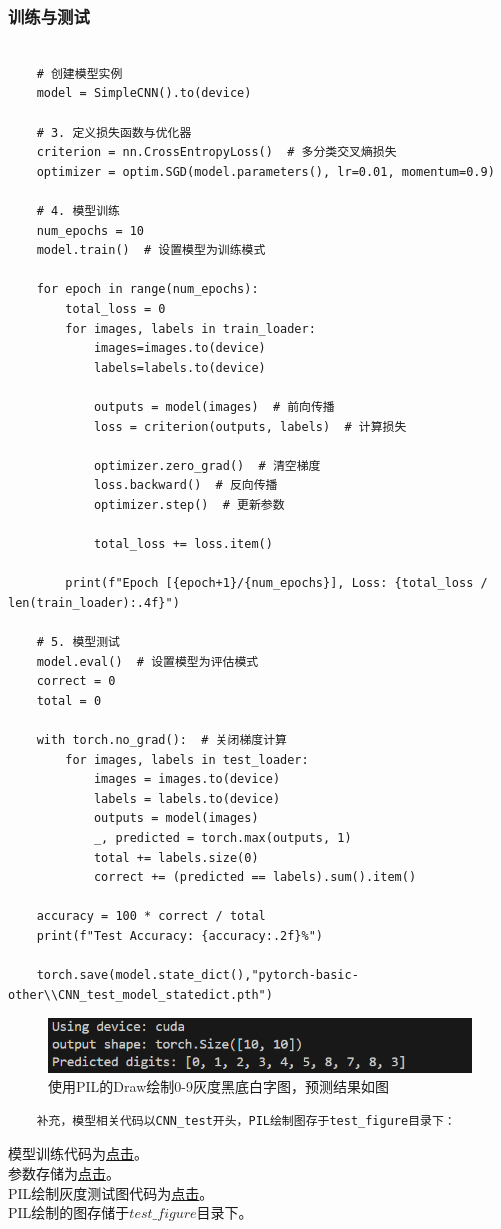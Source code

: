\documentclass[UTF8]{ctexart}
\begin{document}
\subsubsection{训练与测试}
\begin{verbatim}
		
	# 创建模型实例
	model = SimpleCNN().to(device)

	# 3. 定义损失函数与优化器
	criterion = nn.CrossEntropyLoss()  # 多分类交叉熵损失
	optimizer = optim.SGD(model.parameters(), lr=0.01, momentum=0.9)

	# 4. 模型训练
	num_epochs = 10
	model.train()  # 设置模型为训练模式

	for epoch in range(num_epochs):
		total_loss = 0
		for images, labels in train_loader:
			images=images.to(device)
			labels=labels.to(device)

			outputs = model(images)  # 前向传播
			loss = criterion(outputs, labels)  # 计算损失

			optimizer.zero_grad()  # 清空梯度
			loss.backward()  # 反向传播
			optimizer.step()  # 更新参数

			total_loss += loss.item()

		print(f"Epoch [{epoch+1}/{num_epochs}], Loss: {total_loss / len(train_loader):.4f}")

	# 5. 模型测试
	model.eval()  # 设置模型为评估模式
	correct = 0
	total = 0

	with torch.no_grad():  # 关闭梯度计算
		for images, labels in test_loader:
			images = images.to(device)
			labels = labels.to(device)
			outputs = model(images)
			_, predicted = torch.max(outputs, 1)
			total += labels.size(0)
			correct += (predicted == labels).sum().item()

	accuracy = 100 * correct / total
	print(f"Test Accuracy: {accuracy:.2f}%")

	torch.save(model.state_dict(),"pytorch-basic-other\\CNN_test_model_statedict.pth")
\end{verbatim}
\begin{figure}[H]
	\centering
	\includegraphics[width=0.7\linewidth]{figure/CNN_test_result.png}
	\caption{使用PIL的Draw绘制0-9灰度黑底白字图，预测结果如图}
\end{figure}
\begin{verbatim}
	补充，模型相关代码以CNN_test开头，PIL绘制图存于test_figure目录下：
\end{verbatim}
\qquad
模型训练代码为\href{file:pytorch-basic-other/CNN_test.py}{点击}。\\
\indent 参数存储为\href{file:pytorch-basic-other/CNN_test_model_statedict.pth}{点击}。
\\
\indent PIL绘制灰度测试图代码为\href{file:pytorch-basic-other/CNN_test_use.py}{点击}。
\\
\indent PIL绘制的图存储于$test\_figure$目录下。
\end{document}
